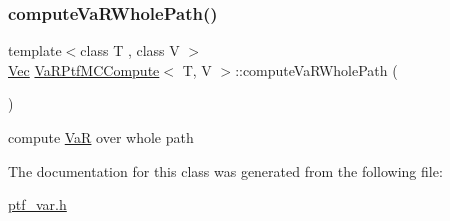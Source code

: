 \subsubsection{\texorpdfstring{compute\+Va\+R\+Whole\+Path()}{computeVaRWholePath()}}
{\footnotesize\ttfamily template$<$class T , class V $>$ \\
\hyperlink{compute__returns__eigen_8h_a1eb6a9306ef406d7975f3cbf2e247777}{Vec} \hyperlink{classVaRPtfMCCompute}{Va\+R\+Ptf\+M\+C\+Compute}$<$ T, V $>$\+::compute\+Va\+R\+Whole\+Path (\begin{DoxyParamCaption}{ }\end{DoxyParamCaption})\hspace{0.3cm}{\ttfamily [inline]}}



compute \hyperlink{classVaR}{VaR} over whole path 



The documentation for this class was generated from the following file\+:\begin{DoxyCompactItemize}
\item 
\hyperlink{ptf__var_8h}{ptf\+\_\+var.\+h}\end{DoxyCompactItemize}
